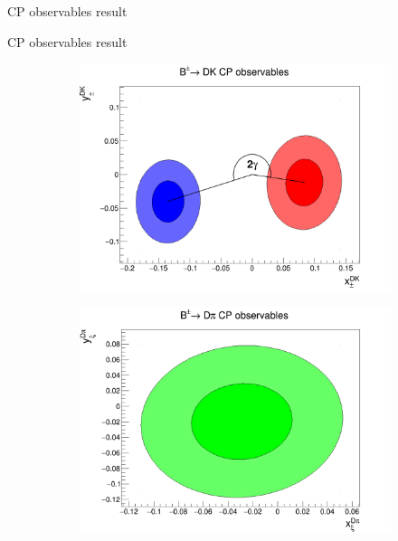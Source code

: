 \documentclass{beamer}
\begin{document}
\begin{frame}{CP observables result}
\end{frame}

\begin{frame}{CP observables result}
  \begin{figure}
    \centering
    \begin{subfigure}{0.50\textwidth}
      \includegraphics[width = 1.0\textwidth]{Plots/B2DK_CP_Observables_Contours.png}
    \end{subfigure}%
    \begin{subfigure}{0.50\textwidth}
      \includegraphics[width = 1.0\textwidth]{Plots/B2Dpi_CP_Observables_Contours.png}
    \end{subfigure}
  \end{figure}
  \begin{center}
    \huge \vphantom{Could there be a sign error in $s_i$?}
  \end{center}
\end{frame}
\end{document}
